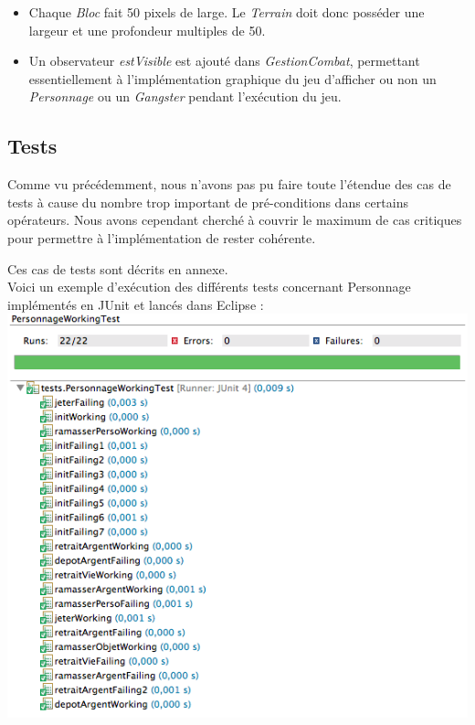 \documentclass[a4paper, 11pt, notitlepage]{article}
\begin{document}
\begin{itemize}
\item Chaque \emph{Bloc} fait 50 pixels de large. Le \emph{Terrain} doit donc posséder une largeur et une profondeur multiples de 50. \\

\item Un observateur \emph{estVisible} est ajouté dans \emph{GestionCombat}, permettant essentiellement à l'implémentation graphique du jeu d'afficher ou non un \emph{Personnage} ou un \emph{Gangster} pendant l'exécution du jeu.

\end{itemize}

\subsection{Tests}

Comme vu précédemment, nous n'avons pas pu faire toute l'étendue des cas de tests à cause du nombre trop important de pré-conditions dans certains opérateurs. Nous avons cependant cherché à couvrir le maximum de cas critiques pour permettre à l'implémentation de rester cohérente.

Ces cas de tests sont décrits en annexe. \\

Voici un exemple d'exécution des différents tests concernant Personnage implémentés en JUnit et lancés dans Eclipse : \\

\noindent
\includegraphics[scale=0.8]{testPersonnage.png}
\end{document}
